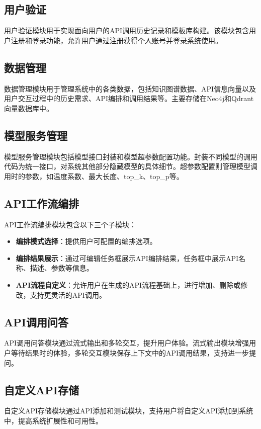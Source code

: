 \subsection{用户验证}
用户验证模块用于实现面向用户的API调用历史记录和模板库构建。该模块包含用户注册和登录功能，允许用户通过注册获得个人账号并登录系统使用。

\subsection{数据管理}
数据管理模块用于管理系统中的各类数据，包括知识图谱数据、API信息向量以及用户交互过程中的历史需求、API编排和调用结果等。主要存储在Neo4j和Qdrant向量数据库中。

\subsection{模型服务管理}
模型服务管理模块包括模型接口封装和模型超参数配置功能。封装不同模型的调用代码为统一接口，对系统其他部分隐藏模型的具体细节。超参数配置则管理模型调用时的参数，如温度系数、最大长度、top\_k、top\_p等。

\subsection{API工作流编排}
API工作流编排模块包含以下三个子模块：
\begin{itemize}
    \item \textbf{编排模式选择}：提供用户可配置的编排选项。
    \item \textbf{编排结果展示}：通过可编辑任务框展示API编排结果，任务框中展示API名称、描述、参数等信息。
    \item \textbf{API流程自定义}：允许用户在生成的API流程基础上，进行增加、删除或修改，支持更灵活的API调用。
\end{itemize}

\subsection{API调用问答}
API调用问答模块通过流式输出和多轮交互，提升用户体验。流式输出模块增强用户等待结果时的体验，多轮交互模块保存上下文中的API调用结果，支持进一步提问。

\subsection{自定义API存储}
自定义API存储模块通过API添加和测试模块，支持用户将自定义API添加到系统中，提高系统扩展性和可用性。

